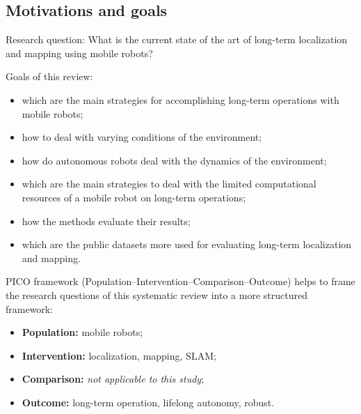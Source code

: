 \subsection{Motivations and goals}

Research question: What is the current state of the art of long-term localization and mapping using mobile robots?

Goals of this review:

\begin{itemize}[nosep]
\item which are the main strategies for accomplishing long-term operations with mobile robots;
\item how to deal with varying conditions of the environment;
\item how do autonomous robots deal with the dynamics of the environment;
\item which are the main strategies to deal with the limited computational resources of a mobile robot on long-term operations;
\item how the methods evaluate their results;
\item which are the public datasets more used for evaluating long-term localization and mapping.
\end{itemize}

PICO framework (Population--Intervention--Comparison--Outcome) helps to frame the research questions of this systematic review into a more structured framework:

\begin{itemize}[nosep]
\item \textbf{Population:} mobile robots;
\item \textbf{Intervention:} localization, mapping, SLAM;
\item \textbf{Comparison:} \textit{not applicable to this study};
\item \textbf{Outcome:} long-term operation, lifelong autonomy, robust.
\end{itemize}

